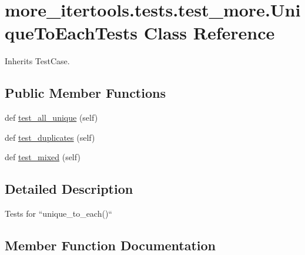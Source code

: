 \hypertarget{classmore__itertools_1_1tests_1_1test__more_1_1_unique_to_each_tests}{}\section{more\+\_\+itertools.\+tests.\+test\+\_\+more.\+Unique\+To\+Each\+Tests Class Reference}
\label{classmore__itertools_1_1tests_1_1test__more_1_1_unique_to_each_tests}


Inherits Test\+Case.

\subsection*{Public Member Functions}
\begin{DoxyCompactItemize}
\item 
def \hyperlink{classmore__itertools_1_1tests_1_1test__more_1_1_unique_to_each_tests_a6885111e7e1556992f34259a7a51df00}{test\+\_\+all\+\_\+unique} (self)
\item 
def \hyperlink{classmore__itertools_1_1tests_1_1test__more_1_1_unique_to_each_tests_aed294e7bc8e6abd785831d00b0efc918}{test\+\_\+duplicates} (self)
\item 
def \hyperlink{classmore__itertools_1_1tests_1_1test__more_1_1_unique_to_each_tests_ac6fb56937a327cd41323976c6a1b48af}{test\+\_\+mixed} (self)
\end{DoxyCompactItemize}


\subsection{Detailed Description}
\begin{DoxyVerb}Tests for ``unique_to_each()``\end{DoxyVerb}
 

\subsection{Member Function Documentation}
\mbox{\label{classmore__itertools_1_1tests_1_1test__more_1_1_unique_to_each_tests_a6885111e7e1556992f34259a7a51df00}} 
